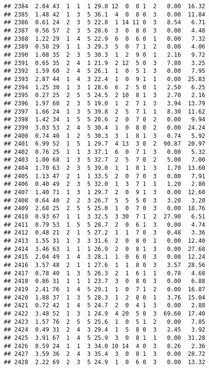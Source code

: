 \documentclass[
]{article}
\begin{document}
\begin{verbatim}
## 2384  2.04 43  1  1  1 29.8 12  0  8 1  2   0.00  16.32
## 2385  1.48 42  1  3  5 36.1  4  0  8 0  3   0.00  11.84
## 2386  0.61 24  2  3  5 22.8  1 14 11 0  3   8.54   6.71
## 2387  0.56 57  2  3  5 28.6  3  0  8 0  3   0.00   4.48
## 2388  1.22 29  1  4  5 22.9  6  0  6 0  1   0.00   7.32
## 2389  0.58 29  1  1  3 29.3  5  0  7 1  2   0.00   4.06
## 2390  1.08 35  2  3  5 30.3  1  2  9 0  1   2.16   9.72
## 2391  0.65 35  2  4  1 21.9  2 12  5 0  3   7.80   3.25
## 2392  1.59 60  2  4  5 26.1  1  0  5 1  3   0.00   7.95
## 2393  2.87 44  1  4  3 22.4  1  0  9 1  1   0.00  25.83
## 2394  1.25 30  1  3  1 28.6  6  2  5 0  1   2.50   6.25
## 2395  0.27 25  2  5  5 24.5  2 10  8 1  3   2.70   2.16
## 2396  1.97 60  2  3  5 19.0  1  2  7 1  3   3.94  13.79
## 2397  1.66 24  1  3  5 39.8  2  5  7 1  1   8.30  11.62
## 2398  1.42 34  1  5  5 20.6  2  0  7 0  2   0.00   9.94
## 2399  3.03 53  2  4  5 30.4  1  0  8 0  2   0.00  24.24
## 2400  0.74 40  1  2  5 30.3  3  1  8 1  3   0.74   5.92
## 2401  6.99 52  1  5  1 29.7  4 13  3 0  2  90.87  20.97
## 2402  0.76 25  1  1  3 37.1  6  0  7 1  3   0.00   5.32
## 2403  1.00 68  1  3  5 32.7  2  5  7 0  2   5.00   7.00
## 2404  1.70 63  2  3  5 39.0  1  1  8 1  3   1.70  13.60
## 2405  1.13 47  2  1  1 33.5  2  0  7 0  3   0.00   7.91
## 2406  0.40 49  2  3  5 32.0  1  3  7 1  1   1.20   2.80
## 2407  1.40 71  1  3  1 29.7  2  0  9 1  3   0.00  12.60
## 2408  0.64 40  2  2  3 26.7  5  5  5 0  3   3.20   3.20
## 2409  2.68 25  2  5  5 25.0  1  0  7 0  3   0.00  18.76
## 2410  0.93 67  1  1  3 32.5  3 30  7 1  2  27.90   6.51
## 2411  0.79 53  1  5  5 28.7  2  0  6 1  3   0.00   4.74
## 2412  0.48 21  2  1  5 27.2  1  1  7 0  3   0.48   3.36
## 2413  1.55 31  1  3  3 31.6  2  0  8 0  1   0.00  12.40
## 2414  3.46 63  1  1  1 26.9  2  0  8 1  3   0.00  27.68
## 2415  2.04 49  1  4  3 28.1  1  0  6 0  3   0.00  12.24
## 2416  3.57 48  2  1  1 27.6  1  1  8 0  3   3.57  28.56
## 2417  0.78 40  1  3  5 26.3  2  1  6 1  1   0.78   4.68
## 2418  0.86 31  1  1  1 23.7  3  0  8 0  3   0.00   6.88
## 2419  2.41 76  1  4  5 29.1  1  0  7 1  2   0.00  16.87
## 2420  1.88 37  1  3  5 28.3  1  2  8 0  1   3.76  15.04
## 2421  0.72 42  1  4  5 24.7  2  0  4 1  3   0.00   2.88
## 2422  3.48 52  1  3  1 24.9  4 20  5 0  3  69.60  17.40
## 2423  1.57 76  2  5  5 25.6  1  0  5 1  2   0.00   7.85
## 2424  0.49 31  2  4  3 29.4  1  5  8 0  3   2.45   3.92
## 2425  3.91 67  1  4  5 25.9  3  0  8 1  1   0.00  31.28
## 2426  0.59 24  1  1  3 34.0 10 14  4 0  3   8.26   2.36
## 2427  3.59 36  2  4  3 35.4  3  0  8 1  3   0.00  28.72
## 2428  2.22 69  2  3  5 24.9  1  0  6 0  3   0.00  13.32

\end{verbatim}
\end{document}
